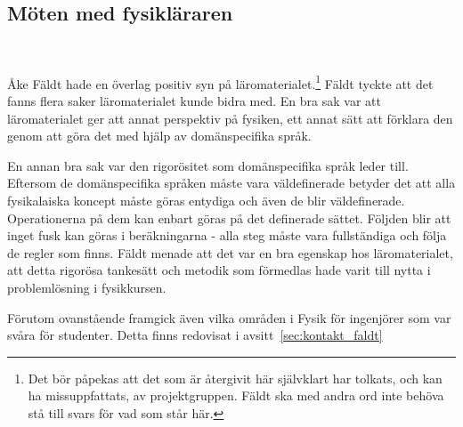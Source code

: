 \begin{draft}
\section{Möten med fysikläraren}~\label{sec:res_ake}

Åke Fäldt hade en överlag positiv syn på läromaterialet.\footnote{Det bör
påpekas att det som är återgivit här självklart har tolkats, och kan ha
missuppfattats, av projektgruppen. Fäldt ska med andra ord inte behöva stå till
svars för vad som står här.} Fäldt tyckte att det fanns flera saker
läromaterialet kunde bidra med. En bra sak var att läromaterialet ger att annat
perspektiv på fysiken, ett annat sätt att förklara den genom att göra det med
hjälp av domänspecifika språk.

En annan bra sak var den rigorösitet som domänspecifika språk leder till.
Eftersom de domänspecifika språken måste vara väldefinerade betyder det att alla
fysikalaiska koncept måste göras entydiga och även de blir väldefinerade.
Operationerna på dem kan enbart göras på det definerade sättet. Följden blir att
inget fusk kan göras i beräkningarna - alla steg måste vara fullständiga och
följa de regler som finns. Fäldt menade att det var en bra egenskap hos
läromaterialet, att detta rigorösa tankesätt och metodik som förmedlas hade
varit till nytta i problemlösning i fysikkursen.

Förutom ovanstående framgick även vilka områden i Fysik för ingenjörer som var
svåra för studenter. Detta finns redovisat i avsitt~\ref{sec:kontakt_faldt}

\end{draft}































